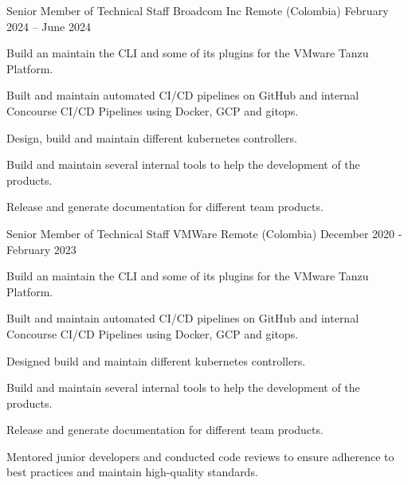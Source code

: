 

\begin{cventries}

  \cventry
    {Senior Member of Technical Staff} %
    {Broadcom Inc} %
    {Remote (Colombia)} %
    {February 2024 – June 2024 } %
    {
      \begin{cvitems} %
        \item {Build an maintain the CLI and some of its plugins for the VMware Tanzu Platform.}
        \item {Built and maintain automated CI/CD pipelines on GitHub and internal Concourse CI/CD Pipelines using Docker, GCP and gitops.}
        \item {Design, build and maintain different kubernetes controllers.}
        \item {Build and maintain several internal tools to help the development of the products.}
        \item {Release and generate documentation for different team products.}
      \end{cvitems}
    }

  \cventry
    {Senior Member of Technical Staff} %
    {VMWare} %
    {Remote (Colombia)} %
    {December 2020 - February 2023 } %
    {
      \begin{cvitems} %
        \item {Build an maintain the CLI and some of its plugins for the VMware Tanzu Platform.}
        \item {Built and maintain automated CI/CD pipelines on GitHub and internal Concourse CI/CD Pipelines using Docker, GCP and gitops.}
        \item {Designed  build and maintain different kubernetes controllers.}
        \item {Build and maintain several internal tools to help the development of the products.}
        \item {Release and generate documentation for different team products.}
        \item {Mentored junior developers and conducted code reviews to ensure adherence to best practices and maintain high-quality standards.}
      \end{cvitems}
    }


\end{cventries}
